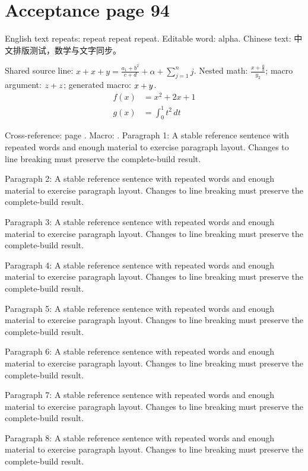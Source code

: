 \section*{Acceptance page 94}
\label{page:94}
English text repeats: repeat repeat repeat. Editable word: alpha.
Chinese text: 中文排版测试，数学与文字同步。\par
Shared source line: $x+x+y=\frac{a_{1}+b^{2}}{c+d}+\alpha+\sum_{j=1}^{n}j$.
Nested math: $\frac{x+\frac{a}{b}}{y_{2}}$; macro argument: $z+z$; generated macro: $x+y$.
\begin{align*}
 f(x)&=x^{2}+2x+1\\
 g(x)&=\int_{0}^{1} t^{2}\,dt
\end{align*}
\par Cross-reference: page \pageref{page:1}. Macro: \globalword.
Paragraph 1: A stable reference sentence with repeated words and enough material to exercise paragraph layout. Changes to line breaking must preserve the complete-build result.\par
Paragraph 2: A stable reference sentence with repeated words and enough material to exercise paragraph layout. Changes to line breaking must preserve the complete-build result.\par
Paragraph 3: A stable reference sentence with repeated words and enough material to exercise paragraph layout. Changes to line breaking must preserve the complete-build result.\par
Paragraph 4: A stable reference sentence with repeated words and enough material to exercise paragraph layout. Changes to line breaking must preserve the complete-build result.\par
Paragraph 5: A stable reference sentence with repeated words and enough material to exercise paragraph layout. Changes to line breaking must preserve the complete-build result.\par
Paragraph 6: A stable reference sentence with repeated words and enough material to exercise paragraph layout. Changes to line breaking must preserve the complete-build result.\par
Paragraph 7: A stable reference sentence with repeated words and enough material to exercise paragraph layout. Changes to line breaking must preserve the complete-build result.\par
Paragraph 8: A stable reference sentence with repeated words and enough material to exercise paragraph layout. Changes to line breaking must preserve the complete-build result.\par
\newpage
